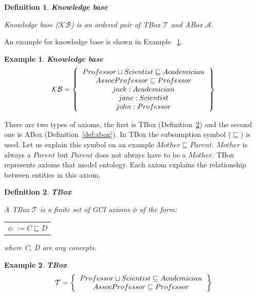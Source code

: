 \documentclass[12pt,a4paper]{article}
\newtheorem{definition}{Definition}[subsection]
\newtheorem{example}{Example}[subsection]
\begin{document}
\begin{definition}{\textbf{Knowledge base}}
	\label{def:knowledgeBase}
	
	Knowledge base ($\mathcal{KB}$) is an ordered pair of \textit{TBox} $\mathcal{T}$ and \textit{ABox} $\mathcal{A}$.
\end{definition}

An example for knowledge base is shown in Example ~\ref{example:knowledgeBase}.

\begin{example}{\textbf{Knowledge base}}
	\label{example:knowledgeBase}
	\[ 
	\mathcal{KB} = \left\{
	\begin{tabular}{c c}
	$Professor \sqcup Scientist \sqsubseteq Academician$ \\
	$AssocProfessor \sqsubseteq Professor$ \\
	$jack : Academician$ \\
	$jane : Scientist$ \\
	$john : Professor$ \\	
	\end{tabular}
	\right \}
	\]
\end{example}

There are two types of axioms, the first is TBox (Definition~\ref{def:tbox}) and the second one is ABox (Definition~\ref{def:abox}). In TBox the subsumption symbol ($\sqsubseteq$) is used. Let us explain this symbol on an example $Mother \sqsubseteq Parent$. $Mother$ is always a $Parent$ but $Parent$ does not always have to be a $Mother$. TBox represents axioms that model ontology. Each axiom explains the relationship between entities in this axiom.

\begin{definition}{\textbf{TBox}}
	\label{def:tbox}
	
	A TBox $\mathcal{T}$ is a finite set of GCI axioms $\phi$ of the form:
	
	\begin{table}[H]
		\centering
		\begin{tabular}{c}
			$ \phi ::= C \sqsubseteq D $
		\end{tabular}
	\end{table}
			
	where C, D are any concepts.
\end{definition}

\begin{example}{\textbf{TBox}}
	\[ 
	\mathcal{T} = \left\{
	\begin{tabular}{c c}
	$Professor \sqcup Scientist \sqsubseteq Academician$ \\
	$AssocProfessor \sqsubseteq Professor$ \\
	\end{tabular}
	\right \}
	\]
\end{example}
\end{document}
